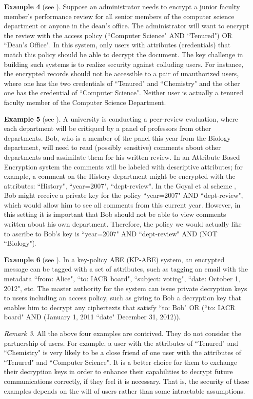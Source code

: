 \documentclass[11pt]{article}
\begin{document}
\textbf{Example 4} (see \cite{LWa11}). Suppose an administrator
needs to encrypt a junior faculty member's performance review for all senior members of the
computer science department or anyone in the dean's office. The administrator will want to
encrypt the review with the access policy (``Computer Science" AND ``Tenured") OR
``Dean's Office". In this system, only users with attributes (credentials) that match this
policy should be able to decrypt the document. The key challenge in building such systems is
to realize security against colluding users. For instance, the encrypted records should not be
accessible to a pair of unauthorized users, where one has the two credentials of ``Tenured" and ``Chemistry" and
the other one has the credential of ``Computer Science". Neither
user is actually a tenured faculty member of the Computer Science Department.

\textbf{Example 5} (see \cite{OSW07}). A university
is conducting a peer-review evaluation, where each department will be critiqued by a panel of
professors from other departments. Bob, who is a member of the panel this year from the Biology
department, will need to read (possibly sensitive) comments about other departments and assimilate
them for his written review. In an Attribute-Based Encryption system the comments will be labeled
with descriptive attributes; for example, a comment on the History department might be encrypted
with the attributes: ``History", ``year=2007", ``dept-review". In the Goyal et al scheme \cite{PTMW06},  Bob
might receive a private key for the policy ``year=2007" AND ``dept-review", which would
allow him to see all comments from this current year. However, in this setting it is important that
Bob should not be able to view comments written about his own department. Therefore, the policy
we would actually like to ascribe to Bob's key is ``year=2007" AND ``dept-review" AND
(NOT ``Biology").

\textbf{Example 6} (see \cite{HW14}). In a key-policy ABE (KP-ABE) system,
an encrypted message can be tagged with a set of attributes, such as tagging an email with the
metadata ``from: Alice", ``to: IACR board", ``subject: voting", ``date: October 1, 2012", etc. The
master authority for the system can issue private decryption keys to users including an access
policy, such as giving to Bob a decryption key that enables him to decrypt any ciphertexts that
satisfy ``to: Bob" OR (``to: IACR board" AND (January 1, 2011  ``date"  December 31, 2012)).

\emph{Remark 3}. All the above four examples are contrived. They do not consider the partnership of users. For example, a user with the attributes of ``Tenured" and ``Chemistry" is very likely to be a close friend of one user with the attributes of ``Tenured" and ``Computer Science". It is a better choice for them to exchange their decryption keys in order to enhance their capabilities to decrypt future communications correctly, if they feel it is necessary. That is, the security of these examples depends on the will of users rather than some intractable assumptions.
\end{document}

